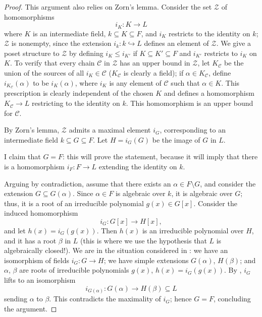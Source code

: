 \begin{proof}
  This argument also relies on Zorn's lemma. Consider the set
  $\mathcal{Z}$ of homomorphisms
  \[
    i_K : K \to L
  \]
  where $K$ is an intermediate field, $k \subseteq K \subseteq F$, and
  $i_K$ restricts to the identity on $k$; $\mathcal{Z}$ is nonempty,
  since the extension $i_k : k \hookrightarrow L$ defines an element
  of $\mathcal{Z}$. We give a poset structure to $\mathcal{Z}$ by
  defining $i_K \leq i_{K'}$ if $K \subseteq K' \subseteq F$ and
  $i_{K'}$ restricts to $i_K$ on $K$. To verify that every chain
  $\mathcal{C}$ in $\mathcal{Z}$ has an upper bound in $\mathcal{Z}$,
  let $K_{\mathcal{C}}$ be the union of the sources of all
  $i_K \in \mathcal{C}$ ($K_{\mathcal{C}}$ is clearly a field); if
  $\alpha \in K_{\mathcal{C}}$, define $i_{K_{\mathcal{C}}}(\alpha)$
  to be $i_K(\alpha)$, where $i_K$ is any element of $\mathcal{C}$
  such that $\alpha \in K$. This prescription is clearly independent
  of the chosen $K$ and defines a homomorphism $K_{\mathcal{C}} \to L$
  restricting to the identity on $k$. This homomorphism is an upper
  bound for $\mathcal{C}$.

  By Zorn's lemma, $\mathcal{Z}$ admits a maximal element $i_G$,
  corresponding to an intermediate field $k \subseteq G \subseteq
  F$. Let $H = i_G(G)$ be the image of $G$ in $L$.

  I claim that $G = F$: this will prove the statement, because it will
  imply that there is a homomorphism $i_F : F \to L$ extending the
  identity on $k$.

  Arguing by contradiction, assume that there exists an
  $\alpha \in F \setminus G$, and consider the extension
  $G \subseteq G(\alpha)$. Since $\alpha \in F$ is algebraic over $k$,
  it is algebraic over $G$; thus, it is a root of an irreducible
  polynomial $g(x) \in G[x]$. Consider the induced homomorphism
  \[
    i_G : G[x] \to H[x],
  \]
  and let $h(x) = i_G(g(x))$. Then $h(x)$ is an irreducible polynomial
  over $H$, and it has a root $\beta$ in $L$ (this is where we use the
  hypothesis that $L$ is algebraically closed!). We are in the
  situation considered in : we have an
  isomorphism of fields $i_G : G \to H$; we have simple extensions
  $G(\alpha)$, $H(\beta)$; and $\alpha$, $\beta$ are roots of
  irreducible polynomials $g(x)$, $h(x) = i_G(g(x))$. By
  , $i_G$ lifts to an isomorphism
  \[
    i_{G(\alpha)} : G(\alpha) \to H(\beta) \subseteq L
  \]
  sending $\alpha$ to $\beta$. This contradicts the maximality of
  $i_G$; hence $G = F$, concluding the argument.
\end{proof}
